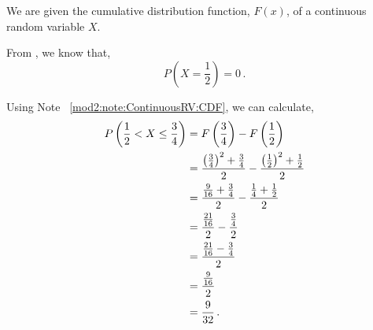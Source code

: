 %
%


\begin{subquestions}
	
\subquestion

We are given the cumulative distribution function, $F(x)$, of a continuous random variable $X$.
	
\begin{subsubquestions}
	
\subsubquestion

From , we know that,
\begin{equation}
	P\left(X= \frac{1}{2}\right) = 0 \,.
\end{equation}
	

\subsubquestion

Using Note ~\ref{mod2:note:ContinuousRV:CDF}, we can calculate,
\begin{align}
	P\left(\frac{1}{2} < X \leq \frac{3}{4}\right) & = F\left(\frac{3}{4}\right) - F\left(\frac{1}{2}\right) \nonumber \\
	                                    & = \frac{\left(\frac{3}{4}\right)^2+\frac{3}{4}}{2} -   \frac{\left(\frac{1}{2}\right)^2+\frac{1}{2}}{2} \nonumber \\
	                                    & = \frac{\frac{9}{16}+\frac{3}{4}}{2} - \frac{\frac{1}{4}+\frac{1}{2}}{2} \nonumber \\
	                                    & = \frac{\frac{21}{16}}{2} - \frac{\frac{3}{4}}{2} \nonumber \\
	                                    & = \frac{\frac{21}{16} - \frac{3}{4}}{2} \nonumber \\
	                                    & = \frac{\frac{9}{16}}{2} \nonumber \\
	                                    & = \frac{9}{32} \,.
\end{align}


\end{subsubquestions}
\end{subquestions}

